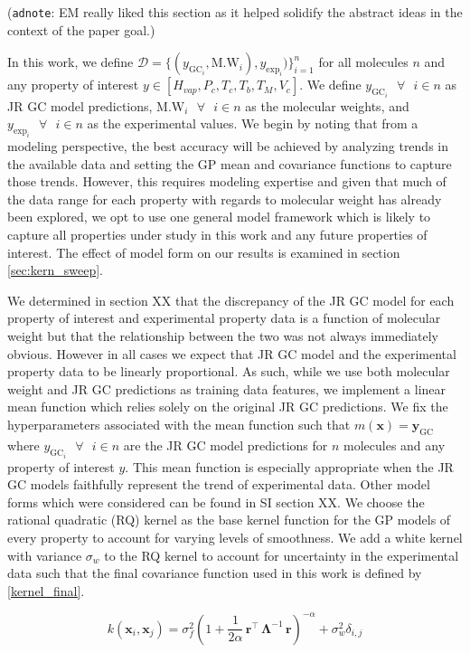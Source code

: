 \documentclass[journal=jacsat,manuscript=article]{achemso}
\newcommand{\xvec}{\ensuremath{\mathbf{x}}}
\newcommand{\adnote}[1]{{\color{OliveGreen} (\texttt{adnote}: #1)}}
\newcommand{\Ygc}[1][]{\ensuremath{y_{\text{GC}_{#1}}}}
\newcommand{\Ygcvec}[1][]{\ensuremath{\mathbf{y}_{\text{GC}_{#1}}}}
\newcommand{\yexp}[1][]{\ensuremath{y_{\text{exp}_{#1}}}}
\begin{document}
\adnote{EM really liked this section as it helped solidify the abstract ideas in the context of the paper goal.}

In this work, we define $\mathcal{D} = \{(\Ygc[i], \text{M.W}_i), \yexp[i])\}_{i=1}^n$ for all molecules $n$ and any property of interest $y \in [H_{vap}, P_c, T_c, T_b ,T_M, V_c]$. We define $\Ygc[i] \text{ } \forall \text{ } i\in n$ as JR GC model predictions, $\text{M.W}_i \text{ } \forall \text{ } i\in n$ as the molecular weights, and $\yexp[i] \text{ } \forall \text{ } i\in n$ as the experimental values. We begin by noting that from a modeling perspective, the best accuracy will be achieved by analyzing trends in the available data and setting the GP mean and covariance functions to capture those trends. However, this requires modeling expertise and given that much of the data range for each property with regards to molecular weight has already been explored, we opt to use one general model framework which is likely to capture all properties under study in this work and any future properties of interest. The effect of model form on our results is examined in section \ref{sec:kern_sweep}.

We determined in section XX that the discrepancy of the JR GC model for each property of interest and experimental property data is a function of molecular weight but that the relationship between the two was not always immediately obvious. However in all cases we expect that JR GC model and the experimental property data to be linearly proportional. As such, while we use both molecular weight and JR GC predictions as training data features, we implement a linear mean function which relies solely on the original JR GC predictions. We fix the hyperparameters associated with the mean function such that $m(\xvec) = \Ygcvec$ where $\Ygc[i] \text{ } \forall \text{ } i\in n$ are the JR GC model predictions for $n$ molecules and any property of interest $y$. This mean function is especially appropriate when the JR GC models faithfully represent the trend of experimental data. Other model forms which were considered can be found in SI section XX. We choose the rational quadratic (RQ) kernel as the base kernel function for the GP models of every property to account for varying levels of smoothness. We add a white kernel with variance $\sigma_w$ to the RQ kernel to account for uncertainty in the experimental data such that the final covariance function used in this work is defined by \eqref{kernel_final}. 

 \begin{equation}
     k(\xvec_i,\xvec_j) = \sigma_f^2 \left(1 +\frac{1}{2 \alpha} \,\mathbf{r}^\intercal \,\boldsymbol{\Lambda}^{-1} \,\mathbf{r} \right)^{-\alpha} + \sigma_w^2\delta_{i,j} 
     \label{kernel_final}
 \end{equation} 
\end{document}
